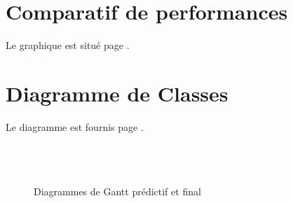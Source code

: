 \documentclass[a4paper]{memoir}
\begin{document}
		\section{Comparatif de performances}
			Le graphique est situé page \pageref{fig:analyse}.
			
		\section{Diagramme de Classes}
			Le diagramme est fournis page \pageref{fig:diagClass}.
			
		\section*{}
			\begin{figure}
				\vspace{-3,5cm} \hspace{-4,5cm} \includegraphics[scale=0.6]{img/Gantt1.png}
				\vspace{-3,5cm} \hspace{-4,5cm} \includegraphics[scale=0.6]{img/Gantt2.png}
				\label{fig:gantt}
				\vspace{-0,5cm} \caption{Diagrammes de Gantt prédictif et final}
			\end{figure}
			
\end{document}
